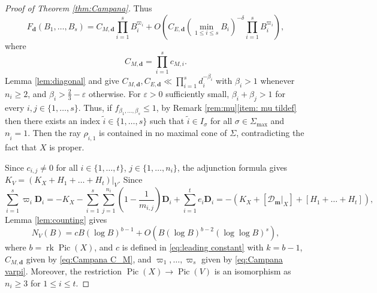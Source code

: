 \documentclass[10pt, a4paper, reqno, english]{amsart}
\newcommand{\divclass}{{\mathbf D}} %
\DeclareMathOperator{\pic}{Pic} %
\DeclareMathOperator{\rk}{rk} %
\theoremstyle{definition}
\numberwithin{theorem}{section}
\numberwithin{equation}{section}
\begin{document}
\begin{proof}[Proof of Theorem \ref{thm:Campana}]
	Thus 
	$$
	F_{\mathbf d}(B_1,\dots,B_s)=C_{M,\mathbf d}\prod_{i=1}^sB_i^{\varpi_i}+O\left(C_{E,\mathbf d}(\min_{1\leq i\leq s}B_i)^{-\delta}\prod_{i=1}^sB_i^{\varpi_i}\right),
	$$
	where 
	\begin{equation}\label{eq:Campana C_M}
	C_{M,\mathbf d}=\prod_{i=1}^sc_{M,i}.
	\end{equation}
	Lemma \ref{lem:diagonal} and \cite[(5.14), (5.15)]{hypmethod} give $C_{M,\mathbf d}, C_{E,\mathbf d}\ll \prod_{i=1}^sd_i^{-\beta_i}$ with $\beta_i>1$ whenever $n_i\geq 2$, and $\beta_i>\frac 23-\varepsilon$ otherwise. For $\varepsilon>0$ sufficiently small, $\beta_i+\beta_j>1$ for every $i,j\in\{1,\dots,s\}$. Thus, if $f_{\beta_1,\dots,\beta_s}\leq 1$, by Remark \ref{rem:mu}\ref{item: mu tildef} then there exists an index $\tilde i\in\{1,\dots,s\}$ such that $\tilde i\in I_\sigma$ for all $\sigma\in\Sigma_{\max}$ and $n_{\tilde i}=1$. Then the ray $\rho_{\tilde i,1}$ is contained in no  maximal cone of $\Sigma$, contradicting the fact that $X$ is proper. 
	
Since $c_{i,j}\neq 0$ for all $i\in\{1,\dots,t\}$, $j\in\{1,\dots,n_i\}$, the adjunction formula \cite[Proposition 16.4]{MR1225842} gives $K_V=(K_X+ H_1+\dots+H_t)|_V$.
	Since
	\begin{equation*}
\sum_{i=1}^s\varpi_i\divclass_i=-K_X-\sum_{i=1}^s\sum_{j=1}^{n_i}(1-\frac 1{m_{i,j}})\divclass_i +\sum_{i=1}^te_i\divclass_i=-(K_X+[\mathscr D_{\mathbf m}|_X] + [H_1+\dots+H_t]),
\end{equation*}
Lemma \ref{lem:counting} gives
$$
N_V(B)=cB(\log B)^{b-1} +O(B(\log B)^{b-2}(\log\log B)^s),
$$
where $b=\rk\pic(X)$, and $c$ is defined in \eqref{eq:leading constant} with $k=b-1$,  $C_{M,\mathbf d}$ given by \eqref{eq:Campana C_M},  and
$\varpi_1,\dots,\varpi_s$ given by \eqref{eq:Campana varpi}. Moreover, the restriction $\pic(X)\to\pic(V)$ is an isomorphism as $n_i\geq 3$ for $1\leq i\leq t$.
\end{proof}




\end{document}
